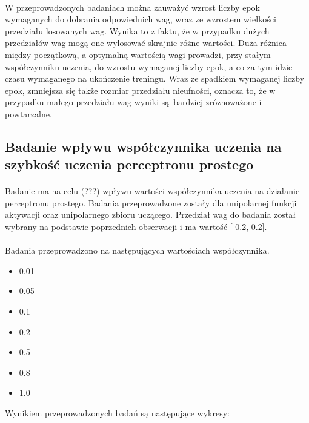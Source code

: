 \documentclass[\main/main.tex]{subfiles}
\begin{document}
    \paragraph{}
    W przeprowadzonych badaniach można zauważyć wzrost liczby epok wymaganych do dobrania odpowiednich wag, wraz ze wzrostem wielkości przedziału losowanych wag. Wynika to z faktu, że w przypadku dużych przedziałów wag mogą one wylosować skrajnie różne wartości. Duża różnica między początkową, a optymalną wartością wagi prowadzi, przy stałym współczynniku uczenia, do wzrostu wymaganej liczby epok, a co za tym idzie czasu wymaganego na ukończenie treningu. Wraz ze spadkiem wymaganej liczby epok, zmniejsza się także rozmiar przedziału nieufności, oznacza to, że w przypadku małego przedziału wag wyniki są bardziej zróznoważone i powtarzalne.

    \justify
    \subsection{Badanie wpływu współczynnika uczenia  na szybkość uczenia perceptronu prostego}
    \paragraph{}
    Badanie ma na celu (???) wpływu wartości współczynnika uczenia na działanie perceptronu prostego. Badania przeprowadzone zostały dla unipolarnej funkcji aktywacji oraz unipolarnego zbioru uczącego. Przedział wag do badania został wybrany na podstawie poprzednich obserwacji i ma wartość [-0.2, 0.2].
    
    \paragraph{}
    Badania przeprowadzono na następujących wartościach współczynnika.
    \begin{itemize}
    \item 0.01
    \item 0.05
    \item 0.1
    \item 0.2
    \item 0.5
    \item 0.8
    \item 1.0
    \end{itemize}
    
    Wynikiem przeprowadzonych badań są następujące wykresy:
    
\end{document}
